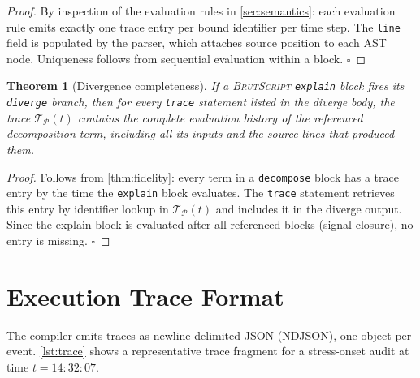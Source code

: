 \documentclass[10pt,twocolumn,a4paper]{article}
\newtheorem{theorem}{Theorem}[section]
\theoremstyle{definition}
\theoremstyle{remark}
\newcommand{\BS}{\textsc{BrutScript}}
\begin{document}
\begin{proof}
By inspection of the evaluation rules in \cref{sec:semantics}: each
evaluation rule emits exactly one trace entry per bound identifier per
time step.  The \texttt{line} field is populated by the parser, which
attaches source position to each AST node.  Uniqueness follows from
sequential evaluation within a block.  $\square$
\end{proof}

\begin{theorem}[Divergence completeness]
\label{thm:divergence}
If a \BS{} \texttt{explain} block fires its \texttt{diverge} branch,
then for every \texttt{trace} statement listed in the diverge body,
the trace $\mathcal{T}_\mathcal{P}(t)$ contains the complete evaluation
history of the referenced decomposition term, including all its inputs
and the source lines that produced them.
\end{theorem}

\begin{proof}
Follows from \cref{thm:fidelity}: every term in a \texttt{decompose}
block has a trace entry by the time the \texttt{explain} block evaluates.
The \texttt{trace} statement retrieves this entry by identifier lookup
in $\mathcal{T}_\mathcal{P}(t)$ and includes it in the diverge output.
Since the explain block is evaluated after all referenced blocks (signal
closure), no entry is missing.  $\square$
\end{proof}

\section{Execution Trace Format}
\label{sec:trace}

The compiler emits traces as newline-delimited JSON (NDJSON), one
object per event.  \cref{lst:trace} shows a representative trace
fragment for a stress-onset audit at time $t = 14{:}32{:}07$.
\end{document}
